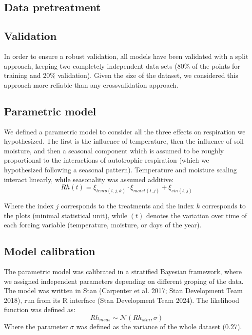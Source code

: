 \documentclass[
]{article}
\begin{document}
\subsection{Data pretreatment}\label{data-pretreatment}

\subsection{Validation}\label{validation}

In order to ensure a robust validation, all models have been validated with a split approach, keeping two completely independent data sets (80\% of the points for training and 20\% validation). Given the size of the dataset, we considered this approach more reliable than any crossvalidation approach.

\subsection{Parametric model}\label{parametric-model}

We defined a parametric model to consider all the three effects on respiration we hypothesized. The first is the influence of temperature, then the influence of soil moisture, and then a seasonal component which is assumed to be roughly proportional to the interactions of autotrophic respiration (which we hypothesized following a seasonal pattern).
Temperature and moisture scaling interact linearly, while seasonality was assumed additive:\\
\[
Rh(t) =  \xi_{temp(t,j, k)} \cdot \xi_{moist(t,j)} + \xi_{sin(t,j)}
\]

Where the index \(j\) corresponds to the treatments and the index \(k\) corresponds to the plots (minimal statistical unit), while \((t)\) denotes the variation over time of each forcing variable (temperature, moisture, or days of the year).

\subsection{Model calibration}\label{model-calibration}

The parametric model was calibrated in a stratified Bayesian framework, where we assigned independent parameters depending on different groping of the data.\\
The model was written in Stan (Carpenter et al. 2017; Stan Development Team 2018), run from its R interface (Stan Development Team 2024).
The likelihood function was defined as:\\
\[
    Rh_{meas} \sim \mathcal{N}(Rh_{sim}, \sigma)
\]
Where the parameter \(\sigma\) was defined as the variance of the whole dataset (0.27).
\end{document}
